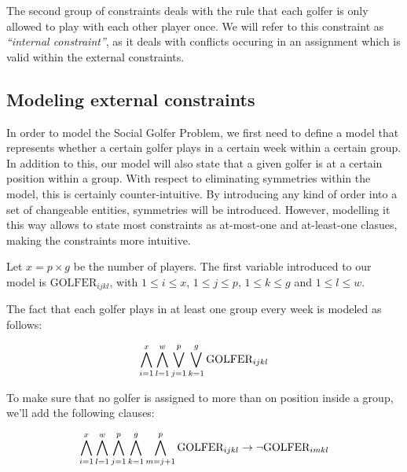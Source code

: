 \documentclass[a4paper]{scrartcl}
\begin{document}
The second group of constraints deals with the rule that each golfer is only allowed to play with each other player once. We will refer to this constraint as \emph{``internal constraint''}, as it deals with conflicts occuring in an assignment which is valid within the external constraints.


\subsection{Modeling external constraints}

In order to model the Social Golfer Problem, we first need to define a model that represents whether a certain golfer plays in a certain week within a certain group. In addition to this, our model will also state that a given golfer is at a certain position within a group. With respect to eliminating symmetries within the model, this is certainly counter-intuitive. By introducing any kind of order into a set of changeable entities, symmetries will be introduced. However, modelling it this way allows to state most constraints as at-most-one and at-least-one clasues, making the constraints more intuitive.

Let $x = p \times g$ be the number of players. The first variable introduced to our model is $\text{GOLFER}_{ijkl}$, with $1 \leq i \leq x$, $1 \leq j \leq p$, $1 \leq k \leq g$ and $1 \leq l \leq w$.



The fact that each golfer plays in at least one group every week is modeled as follows:

\begin{equation}
\label{form:everyone_plays}
\centering
    \bigwedge \limits_{i=1}^x 
    \bigwedge \limits_{l=1}^w 
    \bigvee \limits_{j=1}^p
    \bigvee \limits_{k=1}^g 
    \text{GOLFER}_{ijkl}
\end{equation}

To make sure that no golfer is assigned to more than on position inside a group, we'll add the following clauses:

\begin{equation}
\centering
    \bigwedge \limits_{i=1}^x 
    \bigwedge \limits_{l=1}^w 
    \bigwedge \limits_{j=1}^p
    \bigwedge \limits_{k=1}^g 
    \bigwedge \limits_{m=j+1}^p 
    \text{GOLFER}_{ijkl} 
    \to
    \neg \text{GOLFER}_{imkl}
\end{equation}
\end{document}
